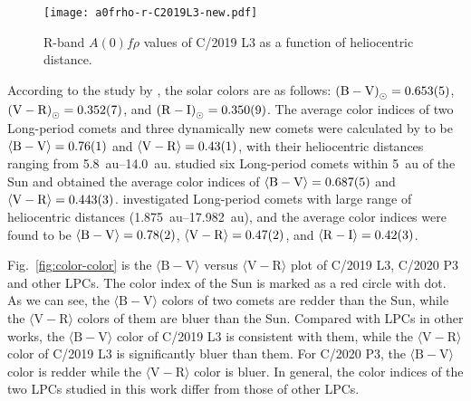 \begin{figure}
    \centering
    \texttt{[image: a0frho-r-C2019L3-new.pdf]}
    \caption{R-band $A(0)f\rho$ values of C/2019 L3 as a function of heliocentric distance. }\label{fig:a0frho-c2019}
\end{figure}

According to the study by \cite{ramirez_ubvric_2012}, the solar colors are as follows: 
${(\mathrm{B} - \mathrm{V})}_{\odot} = \num{0.653 +- 0.005}$, 
${(\mathrm{V} - \mathrm{R})}_{\odot} = \num{0.352 +- 0.007}$, and 
${(\mathrm{R} - \mathrm{I})}_{\odot} = \num{0.350 +- 0.009}$. 
The average color indices of two Long-period comets and three dynamically new comets were calculated by \cite{meech_activity_2009} to be 
$\langle \mathrm{B} - \mathrm{V} \rangle = \num{0.76 +- 0.01}$ and 
$\langle \mathrm{V} - \mathrm{R} \rangle = \num{0.43 +- 0.01}$, 
with their heliocentric distances ranging from \SIrange{5.8}{14.0}{\astronomicalunit}. 
\cite{solontoi_ensemble_2012} studied six Long-period comets within \SI{5}{\astronomicalunit} of the Sun and obtained the average color indices of 
$\langle \mathrm{B} - \mathrm{V} \rangle = \num{0.687 +- 0.005}$ and 
$\langle \mathrm{V} - \mathrm{R} \rangle = \num{0.443 +- 0.003}$. 
\cite{jewittCOLORSYSTEMATICSCOMETS2015} investigated Long-period comets with large range of heliocentric distances (\SIrange{1.875}{17.982}{\astronomicalunit}), and the average color indices were found to be 
$\langle \mathrm{B} - \mathrm{V} \rangle = \num{0.78 +- 0.02}$, 
$\langle \mathrm{V} - \mathrm{R} \rangle = \num{0.47 +- 0.02}$, and 
$\langle \mathrm{R} - \mathrm{I} \rangle = \num{0.42 +- 0.03}$. 


Fig.~\ref{fig:color-color} is the $\langle \mathrm{B}-\mathrm{V} \rangle$ versus $\langle \mathrm{V}-\mathrm{R} \rangle$ plot of C/2019 L3, C/2020 P3 and other LPCs. 
The color index of the Sun \citep{ramirez_ubvric_2012} is marked as a red circle with dot. 
As we can see, the $\langle \mathrm{B} - \mathrm{V} \rangle$ colors of two comets are redder than the Sun, while the $\langle \mathrm{V} - \mathrm{R} \rangle$ colors of them are bluer than the Sun. 
Compared with LPCs in other works, the $\langle \mathrm{B} - \mathrm{V} \rangle$ color of C/2019 L3 is consistent with them, while the $\langle \mathrm{V} - \mathrm{R} \rangle$ color of C/2019 L3 is significantly bluer than them. For C/2020 P3, the $\langle \mathrm{B} - \mathrm{V} \rangle$ color is redder while the $\langle \mathrm{V} - \mathrm{R} \rangle$ color is bluer. 
In general, the color indices of the two LPCs studied in this work differ from those of other LPCs. 


